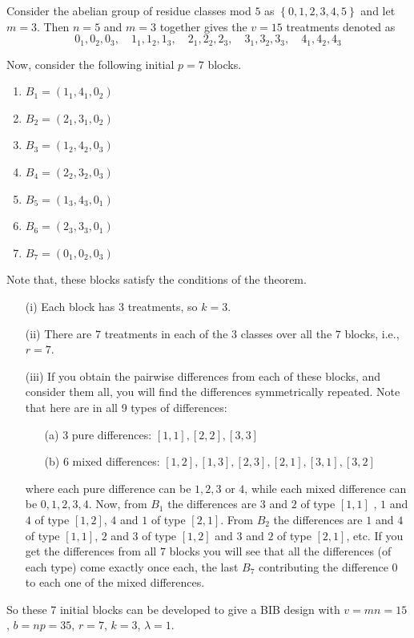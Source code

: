 \documentclass[12pt]{article}
\theoremstyle{definition}
\newenvironment{example}[1][\unskip]{
\begin{tcolorbox}[colback=blue!5!white,colframe=blue!75!black, title = {Example #1}, parbox = false] }{\end{tcolorbox} }
\begin{document}
\begin{example}
    Consider the abelian group of residue classes mod $5$ as $\left\{0,1,2,3,4,5\right\}$ and let $m=3$. Then $n=5$ and $m=3$ together gives the $v=15$ treatments denoted as 
    $$0_1, 0_2, 0_3,  \quad 1_1, 1_2, 1_3, \quad 2_1, 2_2, 2_3,  \quad 3_1, 3_2, 3_3, \quad 4_1, 4_2, 4_3$$
    
    Now, consider the following initial $p = 7$ blocks.
    
    \begin{enumerate}
        \item $B_1 = (1_1, 4_1, 0_2)$
        \item $B_2 =  (2_1, 3_1, 0_2)$
        \item $B_3 = (1_2, 4_2, 0_3)$
        \item $B_4 = (2_2, 3_2, 0_3)$
        \item $B_5 = (1_3, 4_3, 0_1)$
        \item $B_6 = (2_3, 3_3, 0_1)$
        \item $B_7 = (0_1, 0_2, 0_3)$
    \end{enumerate}
    
    Note that, these blocks satisfy the conditions of the theorem.
    \begin{enumerate}
        \item[(i)] Each block has $3$ treatments, so $k = 3$.
        \item[(ii)] There are $7$ treatments in each of the $3$ classes over all the $7$ blocks, i.e., $r=7$.
        \item[(iii)] If you obtain the pairwise differences from each of these blocks, and consider them all, you will find the differences symmetrically repeated.
        Note that here are in all 9 types of differences:
        \begin{enumerate}
            \item[(a)]  $3$ pure differences:  $[1,1], [2,2], [3,3]$
            \item[(b)] $6$ mixed differences: $[1,2], [1,3], [2,3], [2,1], [3,1], [3,2]$
        \end{enumerate}
        where each pure difference can be $1, 2, 3$ or $4$, while each mixed difference can be $0, 1, 2, 3, 4$. Now, from $B_1$ the differences are $3$ and $2$ of type $[1,1]$ ,  $1$ and $4$ of type $[1,2]$,  $4$ and $1$ of type $[2,1]$. From $B_2$ the differences are $1$ and $4$ of type $[1,1]$, $2$ and $3$ of type $[1,2]$ and $3$ and $2$ of type $[2,1]$, etc. If you get the differences from all $7$ blocks you will see that all the differences (of each type) come exactly once each, the last $B_7$ contributing the difference 0 to each one of the mixed differences.
    \end{enumerate}
    So these 7 initial blocks can be developed to give a BIB design with $v= mn = 15$, $b= np = 35$, $r=7$, $k=3$, $\lambda = 1$.
\end{example}
\end{document}

